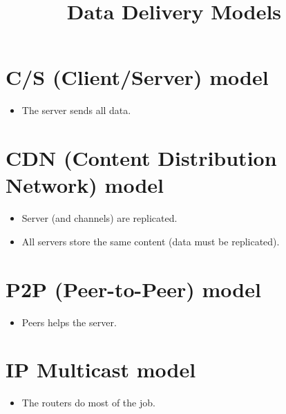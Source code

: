 \title{Data Delivery Models~\cite{transmission-models}}

\maketitle
\tableofcontents

\section{C/S (Client/Server) model}
\begin{itemize}
\item The server sends all data.
\end{itemize}

\section{CDN (Content Distribution Network) model}
\begin{itemize}
\item Server (and channels) are replicated.
\item All servers store the same content (data must be replicated).
\end{itemize}

\section{P2P (Peer-to-Peer) model}
\begin{itemize}
\item Peers helps the server.
\end{itemize}

\section{IP Multicast model}
\begin{itemize}
\item The routers do most of the job.
\end{itemize}
